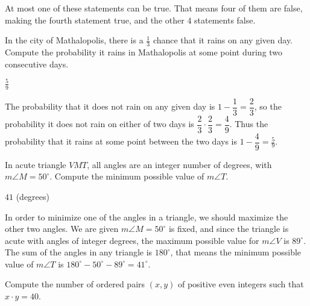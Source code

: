 \documentclass[11pt]{article}
\begin{document}
\begin{solution}
At most one of these statements can be true. That means four of them are false, making the
fourth statement true, and the other $\boxed{4}$ statements false.
\end{solution}


\begin{problem}%
In the city of Mathalopolis, there is a $\frac{1}{3}$ chance that it rains on any given day.
Compute the probability it rains in Mathalopolis at some point during two consecutive days.
\end{problem}

\begin{answer}
$\boxed{\frac{5}{9}}$
\end{answer}

\begin{solution}
The probability that it does not rain on any given day is $1 - \dfrac{1}{3} = \dfrac{2}{3}$,
so the probability it does not rain on either of two days is 
$\dfrac{2}{3} \cdot \dfrac{2}{3} = \dfrac{4}{9}$. Thus the probability that it rains at
some point between the two days is $1 - \dfrac{4}{9} = \boxed{\frac{5}{9}}$.
\end{solution}


\begin{problem}
In acute triangle $VMT$, all angles are an integer number of degrees, 
with $m\angle M = 50^\circ$. Compute the minimum possible value of $m\angle T$.
\end{problem}

\begin{answer}
$\boxed{41}$ (degrees)
\end{answer}

\begin{solution}
In order to minimize one of the angles in a triangle, we should maximize the other two angles. 
We are given $m\angle M = 50^\circ$ is fixed, and since the triangle is acute with angles of
integer degrees, the maximum possible value for $m\angle V$ is $89^\circ$.
The sum of the angles in any triangle is $180^\circ$, that means the minimum possible
value of $m\angle T$ is $180^\circ - 50^\circ - 89^\circ = \boxed{41^\circ}$.
\end{solution}


\begin{problem}
Compute the number of ordered pairs $(x, y)$ of positive even integers such that $x \cdot y = 40$.
\end{problem}
\end{document}
